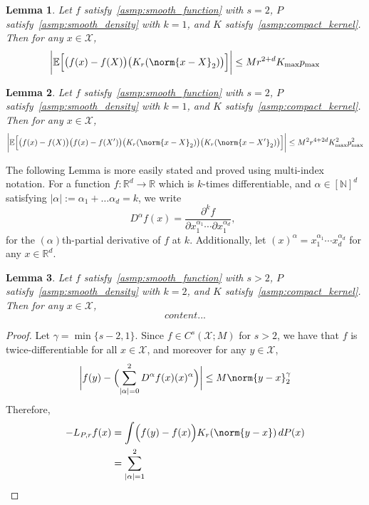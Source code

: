 \documentclass{article}
\newcommand{\Reals}{\mathbb{R}}
\newcommand{\abs}[1]{\left \lvert #1 \right \rvert}
\newcommand{\1}{\mathbf{1}}
\newcommand{\Xset}{\mathcal{X}}
\newcommand{\Ebb}{\mathbb{E}}
\theoremstyle{alden}
\theoremstyle{aldenthm}
\newtheorem{lemma}{Lemma}
\theoremstyle{definition}
\theoremstyle{remark}
\begin{document}
\begin{lemma}
	\label{lem:expectation_2}
	Let $f$ satisfy~\ref{asmp:smooth_function} with $s = 2$, $P$ satisfy~\ref{asmp:smooth_density} with $k = 1$, and $K$ satisfy~\ref{asmp:compact_kernel}. Then for any $x \in \Xset$,
	\begin{equation*}
	\biggl|\Ebb\Bigl[\bigl(f(x) - f(X)\bigr) \bigl(K_r(\norm{x - X}_2)\bigr)\Bigr]\biggr| \leq M r^{2 + d} K_{\max} p_{\max}
	\end{equation*}
\end{lemma}

\begin{lemma}
	\label{lem:expectation_3}
	Let $f$ satisfy~\ref{asmp:smooth_function} with $s = 2$, $P$ satisfy~\ref{asmp:smooth_density} with $k = 1$, and $K$ satisfy~\ref{asmp:compact_kernel}. Then for any $x \in \Xset$,
	\begin{equation*}
	\biggl|\Ebb\Bigl[\bigl(f(x) - f(X)\bigr) \bigl(f(x) - f(X')\bigr) \bigl(K_r(\norm{x - X}_2)\bigr) \bigl(K_r(\norm{x - X'}_2)\bigr)\Bigr]\biggr| \leq M^2 r^{4 + 2d} K_{\max}^2 p_{\max}^2
	\end{equation*}
\end{lemma}

The following Lemma is more easily stated and proved using multi-index notation. For a function $f:\Reals^d \to \Reals$ which is $k$-times differentiable, and $\alpha \in [\mathbb{N}]^d$ satisfying $\abs{\alpha} := \alpha_1 + \ldots \alpha_d = k$,  we write
\begin{equation*}
D^{\alpha}f(x) = \frac{\partial^{k}f }{\partial x_1^{\alpha_1}\cdots\partial x_1^{\alpha_d}},~~ 
\end{equation*}
for the $(\alpha)$th-partial derivative of $f$ at $k$. Additionally, let $(x)^{\alpha} = x_1^{\alpha_1} \cdots x_d^{\alpha_d}$ for any $x \in \Reals^d$.

\begin{lemma}
	\label{lem:LB_approximation_1}
	Let $f$ satisfy~\ref{asmp:smooth_function} with $s > 2$, $P$ satisfy~\ref{asmp:smooth_density} with $k = 2$, and $K$ satisfy~\ref{asmp:compact_kernel}. Then for any $x \in \Xset$,
	\begin{equation*}
	content...
	\end{equation*}
\end{lemma}
\begin{proof}
	Let $\gamma = \min\{s - 2,1\}$. Since $f \in C^s(\Xset;M)$ for $s > 2$, we have that $f$ is twice-differentiable for all $x \in \Xset$, and moreover for any $y \in \Xset$,
	\begin{equation*}
	\biggl| f(y) - \Bigl(\sum_{\abs{\alpha} = 0}^2 D^{\alpha}f(x)(x)^{\alpha}\Bigr)  \biggr| \leq M \norm{y-x}_2^{\gamma}
	\end{equation*}
	Therefore,
	\begin{align*}
	-L_{P,r}f(x) & = \int \Bigl(f(y) - f(x)\Bigr)K_r(\norm{y - x}) \,dP(x) \\
	& = \sum_{\abs{\alpha} = 1}^{2} 
	\end{align*}
\end{proof}
\end{document}
